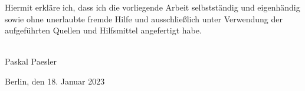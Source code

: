 
\begin{erklärung}        %
Hiermit erkläre ich, dass ich die vorliegende Arbeit selbstständig und eigenhändig sowie ohne unerlaubte fremde Hilfe und ausschließlich unter Verwendung der aufgeführten Quellen und Hilfsmittel angefertigt habe.


\vspace{25mm}

\begin{minipage}[t]{5cm}
\flushleft
\hrulefill \\
Paskal Paesler
\end{minipage}
\hfill
\begin{minipage}[t]{7cm}
\flushright
Berlin, den 18. Januar 2023
\end{minipage}
\end{erklärung}
\ifCLASSINFOlangDE
{}
\else
{}
\fi
